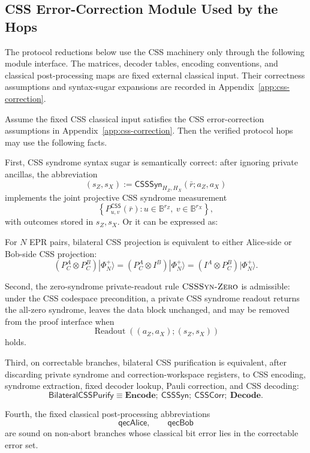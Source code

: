 \documentclass[acmsmall,screen,review,anonymous,nonacm]{acmart}
\theoremstyle{defn_style}
\begin{document}
\subsection{CSS Error-Correction Module Used by the Hops}

The protocol reductions below use the CSS machinery only through the following
module interface. The matrices, decoder tables, encoding conventions, and
classical post-processing maps are fixed external classical input. Their
correctness assumptions and syntax-sugar expansions are recorded in
Appendix~\ref{app:css-correction}.

\begin{theorem}
\label{thm:css-correction-interface}
Assume the fixed CSS classical input satisfies the CSS error-correction
assumptions in Appendix~\ref{app:css-correction}. Then the verified protocol
hops may use the following facts.

First, CSS syndrome syntax sugar is semantically correct: after ignoring
private ancillas, the abbreviation
\[
(s_Z,s_X):=
\mathsf{CSSSyn}_{H_Z,H_X}(\bar r;a_Z,a_X)
\]
implements the joint projective CSS syndrome measurement
\[
\left\{
P^{\mathsf{CSS}}_{u,v}(\bar r)
:
u\in\mathbb B^{r_Z},
\ v\in\mathbb B^{r_X}
\right\},
\]
with outcomes stored in \(s_Z,s_X\). Or it can be expressed as:

For \(N\) EPR pairs, bilateral CSS projection is equivalent to either
Alice-side or Bob-side CSS projection:
\[
(P_C^A\otimes P_C^B)|\Phi_N^+\rangle
=
(P_C^A\otimes I^B)|\Phi_N^+\rangle
=
(I^A\otimes P_C^B)|\Phi_N^+\rangle .
\]

Second, the zero-syndrome private-readout rule
\(\textsc{CSSSyn-Zero}\) is admissible: under the CSS codespace precondition,
a private CSS syndrome readout returns the all-zero syndrome, leaves the data
block unchanged, and may be removed from the proof interface when
\[
\operatorname{Readout}((a_Z,a_X);(s_Z,s_X))
\]
holds.

Third, on correctable branches, bilateral CSS purification is equivalent, after
discarding private syndrome and correction-workspace registers, to CSS
encoding, syndrome extraction, fixed decoder lookup, Pauli correction, and CSS
decoding:
\[
\mathsf{BilateralCSSPurify}
\equiv
\mathbf{Encode};\ \mathsf{CSSSyn};\ \mathsf{CSSCorr};\ \mathbf{Decode}.
\]

Fourth, the fixed classical post-processing abbreviations
\[
\mathsf{qecAlice},
\qquad
\mathsf{qecBob}
\]
are sound on non-abort branches whose classical bit error lies in the
correctable error set.


\end{theorem}
\end{document}
